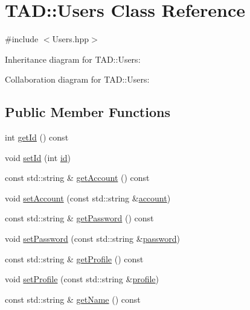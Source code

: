 \hypertarget{class_t_a_d_1_1_users}{}\section{T\+AD\+:\+:Users Class Reference}
\label{class_t_a_d_1_1_users}


{\ttfamily \#include $<$Users.\+hpp$>$}



Inheritance diagram for T\+AD\+:\+:Users\+:


Collaboration diagram for T\+AD\+:\+:Users\+:
\subsection*{Public Member Functions}
\begin{DoxyCompactItemize}
\item 
int \hyperlink{class_t_a_d_1_1_users_a98ba431328ee1a9eb6fe502ddfe6ccc7}{get\+Id} () const
\item 
void \hyperlink{class_t_a_d_1_1_users_a3a81db57c1cebbfc0133d249088ebd2d}{set\+Id} (int \hyperlink{class_t_a_d_1_1_users_a8b8c32b02b9bd942d844d738d94ff21b}{id})
\item 
const std\+::string \& \hyperlink{class_t_a_d_1_1_users_aa013811c11f18e5a6df0a4116908e82b}{get\+Account} () const
\item 
void \hyperlink{class_t_a_d_1_1_users_a478316bff62d1c33325b29a594a52032}{set\+Account} (const std\+::string \&\hyperlink{class_t_a_d_1_1_users_a013ff5d23b0a55d1ff6592c249a541d1}{account})
\item 
const std\+::string \& \hyperlink{class_t_a_d_1_1_users_ac0dd780d69386bfdefba2dd708fe8ae5}{get\+Password} () const
\item 
void \hyperlink{class_t_a_d_1_1_users_abf523db3163e1aa01f13763b6f00e894}{set\+Password} (const std\+::string \&\hyperlink{class_t_a_d_1_1_users_a79868d049deeaf4a13005edd3c25cbc3}{password})
\item 
const std\+::string \& \hyperlink{class_t_a_d_1_1_users_a3a188774061518faec2e1386a1acbe5f}{get\+Profile} () const
\item 
void \hyperlink{class_t_a_d_1_1_users_abcde026b3766964dd34a6c486b409b41}{set\+Profile} (const std\+::string \&\hyperlink{class_t_a_d_1_1_users_a5f4326a94e606d2e6aa6d60ecf0d5e68}{profile})
\item 
const std\+::string \& \hyperlink{class_t_a_d_1_1_users_ace1d4ea0776ad3a59518d5c1c45c7726}{get\+Name} () const
\item 

\end{DoxyCompactItemize}
